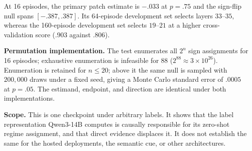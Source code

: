 At 16 episodes, the primary patch estimate is $-.033$ at $p=.75$ and the sign-flip
null spans $[-.387,.387]$. Its 64-episode development set selects layers
$33$--$35$, whereas the 160-episode development set selects $19$--$21$ at a
higher cross-validation score ($.903$ against $.806$).

\noindent\textbf{Permutation implementation.} The test enumerates all $2^{n}$ sign
assignments for 16 episodes; exhaustive enumeration is infeasible for 88
($2^{88}\approx3\times10^{26}$). Enumeration is retained for $n\le20$; above it
the same null is sampled with $200{,}000$ draws under a fixed seed, giving a
Monte Carlo standard error of $.0005$ at $p=.05$. The estimand, endpoint, and
direction are identical under both implementations.

\noindent\textbf{Scope.} This is one checkpoint under arbitrary labels. It shows that
the label representation Qwen3-14B computes is causally responsible for its
zero-shot regime assignment, and that direct evidence displaces it. It does not
establish the same for the hosted deployments, the semantic cue, or other
architectures.

